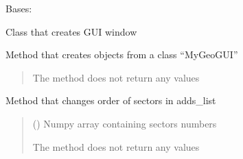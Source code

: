 \documentclass[letterpaper,10pt,english]{sphinxmanual}
\begin{document}
\begin{fulllineitems}
\label{\detokenize{geo_gui:geo_gui.MyGeoGUI}}
\pysigstartsignatures
{}
\pysigstopsignatures
\sphinxAtStartPar
Bases: 

\sphinxAtStartPar
Class that creates GUI window

\begin{fulllineitems}
\label{\detokenize{geo_gui:geo_gui.MyGeoGUI.__init__}}
\pysigstartsignatures
{}
\pysigstopsignatures
\sphinxAtStartPar
Method that creates objects from a class “MyGeoGUI”
\begin{quote}\begin{description}
\sphinxAtStartPar
The method does not return any values

\end{description}\end{quote}

\end{fulllineitems}


\begin{fulllineitems}
\label{\detokenize{geo_gui:geo_gui.MyGeoGUI.change_sekts_order}}
\pysigstartsignatures
{}
\pysigstopsignatures
\sphinxAtStartPar
Method that changes order of sectors in adds\_list
\begin{quote}\begin{description}
\sphinxAtStartPar
{} () \textendash{} Numpy array containing sectors numbers

\sphinxAtStartPar
{}

\sphinxAtStartPar
The method does not return any values

\end{description}\end{quote}


\end{fulllineitems}
\end{fulllineitems}
\end{document}
